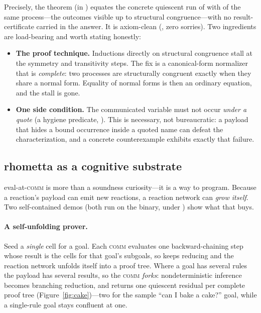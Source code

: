 Precisely, the theorem  (in
) equates the concrete quiescent run of
 with  of the same
process---the outcomes visible up to structural congruence---with no
result-certificate carried in the answer.  It is axiom-clean
(, zero sorries).  Two ingredients
are load-bearing and worth stating honestly:
\begin{itemize}
\item \textbf{The proof technique.}  Inductions directly on structural
  congruence stall at the symmetry and transitivity steps.  The fix is a
  canonical-form normalizer  that is \emph{complete}: two processes
  are structurally congruent exactly when they share a normal form.  Equality of
  normal forms is then an ordinary equation, and the stall is gone.
\item \textbf{One side condition.}  The communicated variable must not occur
  \emph{under a quote} (a hygiene predicate, ).  This is
  necessary, not bureaucratic: a payload that hides a bound occurrence inside a
  quoted name can defeat the characterization, and a concrete counterexample
  exhibits exactly that failure.
\end{itemize}

\subsection{rhometta as a cognitive substrate}

eval-at-\textsc{comm} is more than a soundness curiosity---it is a way to
program.  Because a reaction's payload can emit new reactions, a reaction network
can \emph{grow itself}.  Two self-contained demos (both run on the
 binary, under ) show what
that buys.

\paragraph{A self-unfolding prover.}  Seed a \emph{single} cell for a goal.  Each
\textsc{comm} evaluates one backward-chaining step whose result is the cells for
that goal's subgoals, so  keeps reducing and the reaction
network unfolds itself into a proof tree.  Where a goal has several rules the
payload has several results, so the \textsc{comm} \emph{forks}: nondeterministic
inference becomes branching reduction, and  returns one
quiescent residual per complete proof tree (Figure~\ref{fig:cake})---two for the
sample ``can I bake a cake?'' goal, while a single-rule goal stays confluent at
one.

